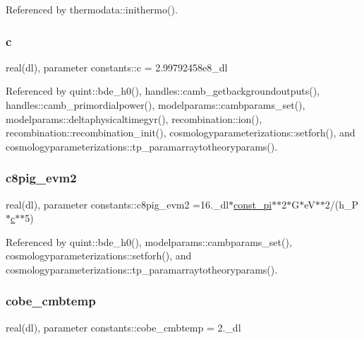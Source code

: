 Referenced by thermodata\+::inithermo().

\mbox{\label{namespaceconstants_acf9c352e48b37fa8a9aff3e5957246b8}} 
\subsubsection{\texorpdfstring{c}{c}}
{\footnotesize\ttfamily real(dl), parameter constants\+::c = 2.\+99792458e8\+\_\+dl}



Referenced by quint\+::bde\+\_\+h0(), handles\+::camb\+\_\+getbackgroundoutputs(), handles\+::camb\+\_\+primordialpower(), modelparams\+::cambparams\+\_\+set(), modelparams\+::deltaphysicaltimegyr(), recombination\+::ion(), recombination\+::recombination\+\_\+init(), cosmologyparameterizations\+::setforh(), and cosmologyparameterizations\+::tp\+\_\+paramarraytotheoryparams().

\mbox{\label{namespaceconstants_aeabc77d1f277c86820ee2994cbdc8ca9}} 
\subsubsection{\texorpdfstring{c8pig\+\_\+evm2}{c8pig\_evm2}}
{\footnotesize\ttfamily real(dl), parameter constants\+::c8pig\+\_\+evm2 =16.\+\_\+dl$\ast$\mbox{\hyperlink{namespaceconstants_ae6b5af15d3fb28a3dba468486c548447}{const\+\_\+pi}}$\ast$$\ast$2$\ast$G$\ast$eV$\ast$$\ast$2/(h\+\_\+P$\ast$\mbox{\hyperlink{namespaceconstants_acf9c352e48b37fa8a9aff3e5957246b8}{c}}$\ast$$\ast$5)}



Referenced by quint\+::bde\+\_\+h0(), modelparams\+::cambparams\+\_\+set(), cosmologyparameterizations\+::setforh(), and cosmologyparameterizations\+::tp\+\_\+paramarraytotheoryparams().

\mbox{\label{namespaceconstants_a6010832f28152003d6ca3a5cea6e7ce9}} 
\subsubsection{\texorpdfstring{cobe\+\_\+cmbtemp}{cobe\_cmbtemp}}
{\footnotesize\ttfamily real(dl), parameter constants\+::cobe\+\_\+cmbtemp = 2.\+\_\+dl}



